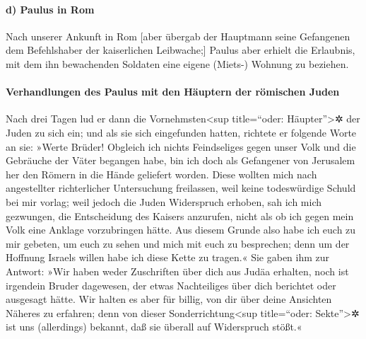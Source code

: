 \hypertarget{d-paulus-in-rom}{%
\paragraph{d) Paulus in Rom}\label{d-paulus-in-rom}}

 Nach unserer Ankunft in Rom {[}aber übergab der
Hauptmann seine Gefangenen dem Befehlshaber der kaiserlichen
Leibwache;{]} Paulus aber erhielt die Erlaubnis, mit dem ihn bewachenden
Soldaten eine eigene (Miets-) Wohnung zu beziehen.

\hypertarget{verhandlungen-des-paulus-mit-den-huxe4uptern-der-ruxf6mischen-juden}{%
\paragraph{Verhandlungen des Paulus mit den Häuptern der römischen
Juden}\label{verhandlungen-des-paulus-mit-den-huxe4uptern-der-ruxf6mischen-juden}}

 Nach drei Tagen lud er dann die Vornehmsten\textless sup
title=``oder: Häupter''\textgreater✲ der Juden zu sich ein; und als sie
sich eingefunden hatten, richtete er folgende Worte an sie: »Werte
Brüder! Obgleich ich nichts Feindseliges gegen unser Volk und die
Gebräuche der Väter begangen habe, bin ich doch als Gefangener von
Jerusalem her den Römern in die Hände geliefert worden. 
Diese wollten mich nach angestellter richterlicher Untersuchung
freilassen, weil keine todeswürdige Schuld bei mir vorlag;
 weil jedoch die Juden Widerspruch erhoben, sah ich mich
gezwungen, die Entscheidung des Kaisers anzurufen, nicht als ob ich
gegen mein Volk eine Anklage vorzubringen hätte.  Aus
diesem Grunde also habe ich euch zu mir gebeten, um euch zu sehen und
mich mit euch zu besprechen; denn um der Hoffnung Israels willen habe
ich diese Kette zu tragen.«  Sie gaben ihm zur Antwort:
»Wir haben weder Zuschriften über dich aus Judäa erhalten, noch ist
irgendein Bruder dagewesen, der etwas Nachteiliges über dich berichtet
oder ausgesagt hätte.  Wir halten es aber für billig, von
dir über deine Ansichten Näheres zu erfahren; denn von dieser
Sonderrichtung\textless sup title=``oder: Sekte''\textgreater✲ ist uns
(allerdings) bekannt, daß sie überall auf Widerspruch stößt.«

